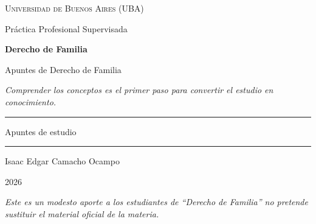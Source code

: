 \documentclass[12pt,oneside]{book}
\newcommand{\universidad}{Universidad de Buenos Aires (UBA)}
\newcommand{\institucion}{Pr\'actica Profesional Supervisada}
\newcommand{\materia}{Derecho de Familia}
\newcommand{\titulo}{Apuntes de Derecho de Familia}
\newcommand{\autor}{Isaac Edgar Camacho Ocampo}
\newcommand{\anio}{2026}
\begin{document}
\begin{titlepage}

\thispagestyle{empty}

\begin{center}

\vspace*{1cm}

{\large \textsc{\universidad}}

\vspace{0.2cm}

{\large \institucion}

\vspace{3cm}

{\Huge \textbf{\materia}}

\vspace{1cm}

{\LARGE \titulo}

\vspace{0.8cm}

\textit{Comprender los conceptos es el primer paso para convertir el estudio en conocimiento.}

\vspace{1.2cm}

\rule{0.70\textwidth}{0.5pt}

\vspace{0.5cm}

{\large Apuntes de estudio}

\vspace{0.5cm}

\rule{0.70\textwidth}{0.5pt}

\vfill

{\large \autor}

\vspace{0.3cm}

{\large \anio}

\end{center}

\vfill

\begin{flushleft}
\textit{Este es un modesto aporte a los estudiantes de ``Derecho de Familia'' no pretende sustituir el material oficial de la materia.}
\end{flushleft}

\end{titlepage}

\tableofcontents
\end{document}
